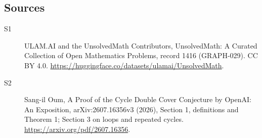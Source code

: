 \documentclass[11pt]{article}
\begin{document}
\subsection{Sources}
\begin{description}
\item[\hypertarget{source:1416:1}{S1}] ULAM.AI and the UnsolvedMath Contributors, UnsolvedMath: A Curated Collection of Open Mathematics Problems, record 1416 (GRAPH-029). CC BY 4.0. \url{https://huggingface.co/datasets/ulamai/UnsolvedMath}.
\item[\hypertarget{source:1416:2}{S2}] Sang-il Oum, A Proof of the Cycle Double Cover Conjecture by OpenAI: An Exposition, arXiv:2607.16356v3 (2026), Section 1, definitions and Theorem 1; Section 3 on loops and repeated cycles. \url{https://arxiv.org/pdf/2607.16356}.
\end{description}
\label{end:1416}
\end{document}
